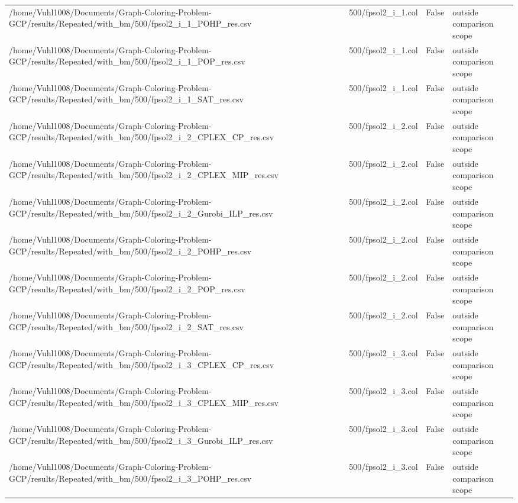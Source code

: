 \begin{table}[htbp]
\begin{tabular}{llll}
/home/Vuhl1008/Documents/Graph-Coloring-Problem-GCP/results/Repeated/with\_bm/500/fpsol2\_i\_1\_POHP\_res.csv & 500/fpsol2\_i\_1.col & False & outside comparison scope \\
/home/Vuhl1008/Documents/Graph-Coloring-Problem-GCP/results/Repeated/with\_bm/500/fpsol2\_i\_1\_POP\_res.csv & 500/fpsol2\_i\_1.col & False & outside comparison scope \\
/home/Vuhl1008/Documents/Graph-Coloring-Problem-GCP/results/Repeated/with\_bm/500/fpsol2\_i\_1\_SAT\_res.csv & 500/fpsol2\_i\_1.col & False & outside comparison scope \\
/home/Vuhl1008/Documents/Graph-Coloring-Problem-GCP/results/Repeated/with\_bm/500/fpsol2\_i\_2\_CPLEX\_CP\_res.csv & 500/fpsol2\_i\_2.col & False & outside comparison scope \\
/home/Vuhl1008/Documents/Graph-Coloring-Problem-GCP/results/Repeated/with\_bm/500/fpsol2\_i\_2\_CPLEX\_MIP\_res.csv & 500/fpsol2\_i\_2.col & False & outside comparison scope \\
/home/Vuhl1008/Documents/Graph-Coloring-Problem-GCP/results/Repeated/with\_bm/500/fpsol2\_i\_2\_Gurobi\_ILP\_res.csv & 500/fpsol2\_i\_2.col & False & outside comparison scope \\
/home/Vuhl1008/Documents/Graph-Coloring-Problem-GCP/results/Repeated/with\_bm/500/fpsol2\_i\_2\_POHP\_res.csv & 500/fpsol2\_i\_2.col & False & outside comparison scope \\
/home/Vuhl1008/Documents/Graph-Coloring-Problem-GCP/results/Repeated/with\_bm/500/fpsol2\_i\_2\_POP\_res.csv & 500/fpsol2\_i\_2.col & False & outside comparison scope \\
/home/Vuhl1008/Documents/Graph-Coloring-Problem-GCP/results/Repeated/with\_bm/500/fpsol2\_i\_2\_SAT\_res.csv & 500/fpsol2\_i\_2.col & False & outside comparison scope \\
/home/Vuhl1008/Documents/Graph-Coloring-Problem-GCP/results/Repeated/with\_bm/500/fpsol2\_i\_3\_CPLEX\_CP\_res.csv & 500/fpsol2\_i\_3.col & False & outside comparison scope \\
/home/Vuhl1008/Documents/Graph-Coloring-Problem-GCP/results/Repeated/with\_bm/500/fpsol2\_i\_3\_CPLEX\_MIP\_res.csv & 500/fpsol2\_i\_3.col & False & outside comparison scope \\
/home/Vuhl1008/Documents/Graph-Coloring-Problem-GCP/results/Repeated/with\_bm/500/fpsol2\_i\_3\_Gurobi\_ILP\_res.csv & 500/fpsol2\_i\_3.col & False & outside comparison scope \\
/home/Vuhl1008/Documents/Graph-Coloring-Problem-GCP/results/Repeated/with\_bm/500/fpsol2\_i\_3\_POHP\_res.csv & 500/fpsol2\_i\_3.col & False & outside comparison scope \\

\end{tabular}
\end{table}
